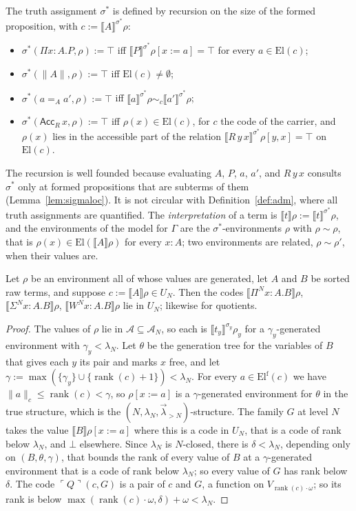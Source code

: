 \documentclass[10pt]{article}
\newcommand{\rk}{\operatorname{rank}}
\newcommand{\sem}[1]{\llbracket #1\rrbracket}
\newcommand{\El}{\mathrm{El}}
\newcommand{\code}[1]{\ulcorner #1\urcorner}
\begin{document}
\begin{definition}\label{def:truth}
The truth assignment $\sigma^*$ is defined by recursion on the size of
the formed proposition, with $c:=\sem A^{\sigma^*}\rho$:
\begin{itemize}
\item $\sigma^*(\Pi x{:}A.P,\rho):=\top$ iff
  $\sem P^{\sigma^*}\rho[x{:=}a]=\top$ for every $a\in\El(c)$;
\item $\sigma^*(\|A\|,\rho):=\top$ iff $\El(c)\ne\emptyset$;
\item $\sigma^*(a=_Aa',\rho):=\top$ iff
  $\sem a^{\sigma^*}\rho\sim_c\sem{a'}^{\sigma^*}\rho$;
\item $\sigma^*(\mathsf{Acc}_R\,x,\rho):=\top$ iff $\rho(x)\in\El(c)$, for
  $c$ the code of the carrier, and $\rho(x)$ lies in the accessible part
  of the relation $\sem{R\,y\,x}^{\sigma^*}\rho[y,x]=\top$ on $\El(c)$.
\end{itemize}
The recursion is well founded because evaluating $A$, $P$, $a$, $a'$,
and $R\,y\,x$ consults $\sigma^*$ only at formed propositions that are
subterms of them (Lemma~\ref{lem:sigmaloc}). It is not circular with
Definition~\ref{def:adm}, where all truth assignments are quantified.
The \emph{interpretation} of a term is $\sem t\rho:=\sem t^{\sigma^*}\rho$,
and the environments of the model for $\Gamma$ are the
$\sigma^*$-environments $\rho$ with $\rho\sim\rho$, that is
$\rho(x)\in\El(\sem A\rho)$ for every $x{:}A$; two environments are
related, $\rho\sim\rho'$, when their values are.
\end{definition}

\begin{lemma}\label{lem:tyform}
Let $\rho$ be an environment all of whose values are generated, let $A$
and $B$ be sorted raw terms, and suppose $c:=\sem A\rho\in U_N$. Then
the codes $\sem{\Pi^Nx{:}A.B}\rho$, $\sem{\Sigma^Nx{:}A.B}\rho$,
$\sem{W^Nx{:}A.B}\rho$ lie in $U_N$; likewise for quotients.
\end{lemma}
\begin{proof}
The values of $\rho$ lie in $\mathcal A\subseteq\mathcal A_N$, so each is
$\sem{t_y}^{\sigma_y}\rho_y$ for a $\gamma_y$-generated environment with
$\gamma_y<\lambda_N$. Let $\theta$ be the generation tree for the
variables of $B$ that gives each $y$ its pair and marks $x$ free, and let
$\gamma:=\max(\{\gamma_y\}\cup\{\rk(c)+1\})<\lambda_N$. For every
$a\in\El^{\mathrm f}(c)$ we have $\|a\|_c\le\rk(c)<\gamma$, so
$\rho[x{:=}a]$ is a $\gamma$-generated environment for $\theta$ in the
true structure, which is the $(N,\lambda_N,\vec\lambda_{>N})$-structure.
The family $G$ at level $N$ takes the value $\sem B\rho[x{:=}a]$ where
this is a code in $U_N$, that is a code of rank below $\lambda_N$, and
$\bot$ elsewhere. Since $\lambda_N$ is $N$-closed, there is
$\delta<\lambda_N$, depending only on $(B,\theta,\gamma)$, that bounds
the rank of every value of $B$ at a $\gamma$-generated environment that
is a code of rank below $\lambda_N$; so every value of $G$ has rank below
$\delta$. The code $\code Q(c,G)$ is a pair of $c$ and $G$, a function on
$V_{\rk(c)\cdot\omega}$; so its rank is below
$\max(\rk(c)\cdot\omega,\delta)+\omega<\lambda_N$.
\end{proof}
\end{document}
